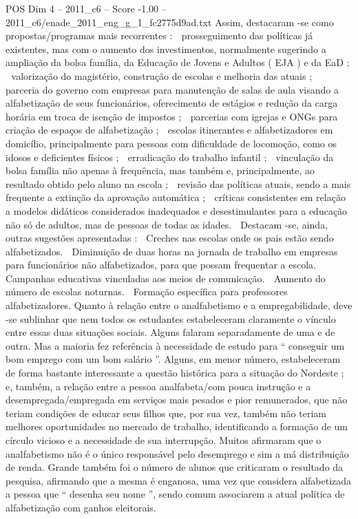 \begin{textsample}{POS Dim 4 – 2011\_c6 – Score -1.00 – 2011\_c6/enade\_2011\_eng\_g\_1\_fc2775d9ad.txt}
Assim, destacaram -se como propostas/programas mais recorrentes :  prosseguimento das políticas já existentes, mas com o aumento dos investimentos, normalmente sugerindo a ampliação da bolsa família, da Educação de Jovens e Adultos ( EJA ) e da EaD ;  valorização do magistério, construção de escolas e melhoria das atuais ;  parceria do governo com empresas para manutenção de salas de aula visando a alfabetização de seus funcionários, oferecimento de estágios e redução da carga horária em troca de isenção de impostos ;  parcerias com igrejas e ONGs para criação de espaços de alfabetização ;  escolas itinerantes e alfabetizadores em domicílio, principalmente para pessoas com dificuldade de locomoção, como os idosos e deficientes físicos ;  erradicação do trabalho infantil ;  vinculação da bolsa família não apenas à frequência, mas também e, principalmente, ao resultado obtido pelo aluno na escola ;  revisão das políticas atuais, sendo a mais frequente a extinção da aprovação automática ;  críticas consistentes em relação a modelos didáticos considerados inadequados e desestimulantes para a educação não só de adultos, mas de pessoas de todas as idades.  Destacam -se, ainda, outras sugestões apresentadas :  Creches nas escolas onde os pais estão sendo alfabetizados.  Diminuição de duas horas na jornada de trabalho em empresas para funcionários não alfabetizados, para que possam frequentar a escola.  Campanhas educativas vinculadas aos meios de comunicação.  Aumento do número de escolas noturnas.  Formação específica para professores alfabetizadores.
Quanto à relação entre o analfabetismo e a empregabilidade, deve -se sublinhar que nem todos os estudantes estabeleceram claramente o vínculo entre essas duas situações sociais.
Alguns falaram separadamente de uma e de outra.
Mas a maioria fez referência à necessidade de estudo para “ conseguir um bom emprego com um bom salário ”.
Alguns, em menor número, estabeleceram de forma bastante interessante a questão histórica para a situação do Nordeste ; e, também, a relação entre a pessoa analfabeta/com pouca instrução e a desempregada/empregada em serviços mais pesados e pior remunerados, que não teriam condições de educar seus filhos que, por sua vez, também não teriam melhores oportunidades no mercado de trabalho, identificando a formação de um círculo vicioso e a necessidade de sua interrupção.
Muitos afirmaram que o analfabetismo não é o único responsável pelo desemprego e sim a má distribuição de renda.
Grande também foi o número de alunos que criticaram o resultado da pesquisa, afirmando que a mesma é enganosa, uma vez que considera alfabetizada a pessoa que “ desenha seu nome ”, sendo comum associarem a atual política de alfabetização com ganhos eleitorais.

\end{textsample}
